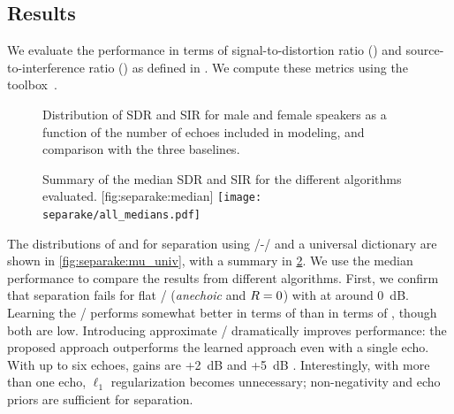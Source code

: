 \subsection{Results}
\label{sec:results}

We evaluate the performance in terms of signal-to-distortion ratio (\SDR) and source-to-interference ratio (\SIR) as defined in .
We compute these metrics using the  toolbox~.

\begin{figure}[t]
    \begin{fullwidth}
    \centering
    \hfill
    \hfill
    \caption{Distribution of SDR and SIR for male and female speakers as a function of the number of echoes included in modeling, and comparison with the three baselines.}
    \label{fig:separake:results}
    \end{fullwidth}
\end{figure}


\begin{figure}[th]
    \begin{sidecaption}[]{
            Summary of the median SDR and SIR for the different algorithms evaluated.
            \label{fig:separake:median}
        }[fig:separake:median]
        \centering
        \small
        \texttt{[image: separake/all\_medians.pdf]}
    \end{sidecaption}
\end{figure}

\mynewline
The distributions of \SDR and \SIR for separation using \MU/-\NMF/ and a universal dictionary are shown in \cref{fig:separake:mu_univ}, with a summary in \cref{fig:separake:median}.
We use the median performance to compare the results from different algorithms.
First, we confirm that separation fails for flat \RTFs/ (\textit{anechoic} and $R=0$) with \SIR at around 0~dB.
Learning the \RTFs/ performs somewhat better in terms of \SIR than in terms of \SDR, though both are low.
Introducing approximate \RTFs/ dramatically improves performance: the proposed approach outperforms the learned approach even with a single echo.
With up to six echoes, gains are +2~dB \SDR and +5~dB \SIR.
Interestingly, with more than one echo, $\ell_1$ regularization becomes unnecessary; non-negativity and echo priors are sufficient for separation.

